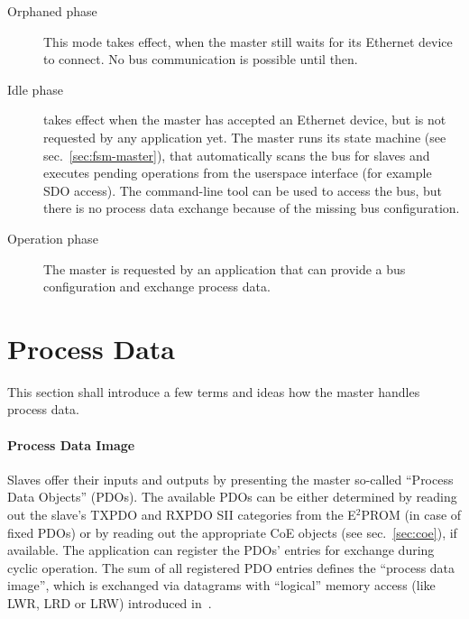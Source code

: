 \documentclass[a4paper,12pt,BCOR6mm,bibtotoc,idxtotoc]{scrbook}
\begin{document}
\begin{description}

\item[Orphaned phase] This mode takes effect, when the
master still waits for its Ethernet device to connect. No bus communication is
possible until then.

\item[Idle phase] takes effect when the master has accepted
an Ethernet device, but is not requested by any application yet. The master
runs its state machine (see sec.~\ref{sec:fsm-master}), that automatically
scans the bus for slaves and executes pending operations from the userspace
interface (for example SDO access). The command-line tool can be used to
access the bus, but there is no process data exchange because of the missing
bus configuration.

\item[Operation phase] The master is requested by an
application that can provide a bus configuration and exchange process data.

\end{description}


\section{Process Data}
\label{sec:processdata}

This section shall introduce a few terms and ideas how the master handles
process data.

\paragraph{Process Data Image}

Slaves offer their inputs and outputs by presenting the master so-called
``Process Data Objects'' (PDOs). The available PDOs can be either
determined by reading out the slave's TXPDO and RXPDO SII categories from the
E$^2$PROM (in case of fixed PDOs) or by reading out the appropriate CoE
objects (see sec.~\ref{sec:coe}), if available.  The application can register
the PDOs' entries for exchange during cyclic operation. The sum of all
registered PDO entries defines the ``process data image'', which is exchanged
via datagrams with ``logical'' memory access (like LWR, LRD or LRW) introduced
in~\cite[sec.~5.4]{dlspec}.
\end{document}
